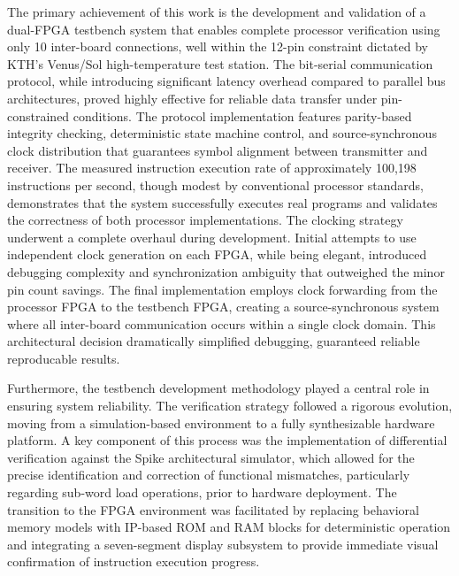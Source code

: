 \documentclass[12pt]{article}
\begin{document}
The primary achievement of this work is the development and validation of a dual-FPGA testbench system that enables complete processor verification using only 10 inter-board connections, well within the 12-pin constraint dictated by KTH's Venus/Sol high-temperature test station. The bit-serial communication protocol, while introducing significant latency overhead compared to parallel bus architectures, proved highly effective for reliable data transfer under pin-constrained conditions.  The protocol implementation features parity-based integrity checking, deterministic state machine control, and source-synchronous clock distribution that guarantees symbol alignment between transmitter and receiver. The measured instruction execution rate of approximately 100,198 instructions per second, though modest by conventional processor standards, demonstrates that the system successfully executes real programs and validates the correctness of both processor implementations.
The clocking strategy underwent a complete overhaul during development. Initial attempts to use independent clock generation on each FPGA, while being elegant, introduced debugging complexity and synchronization ambiguity that outweighed the minor pin count savings. The final implementation employs clock forwarding from the processor FPGA to the testbench FPGA, creating a source-synchronous system where all inter-board communication occurs within a single clock domain. This architectural decision dramatically simplified debugging, guaranteed reliable reproducable results.

Furthermore, the testbench development methodology played a central role in ensuring system reliability. The verification strategy followed a rigorous evolution, moving from a simulation-based environment to a fully synthesizable hardware platform. A key component of this process was the implementation of differential verification against the Spike architectural simulator, which allowed for the precise identification and correction of functional mismatches, particularly regarding sub-word load operations, prior to hardware deployment. The transition to the FPGA environment was facilitated by replacing behavioral memory models with IP-based ROM and RAM blocks for deterministic operation and integrating a seven-segment display subsystem to provide immediate visual confirmation of instruction execution progress.
\end{document}
